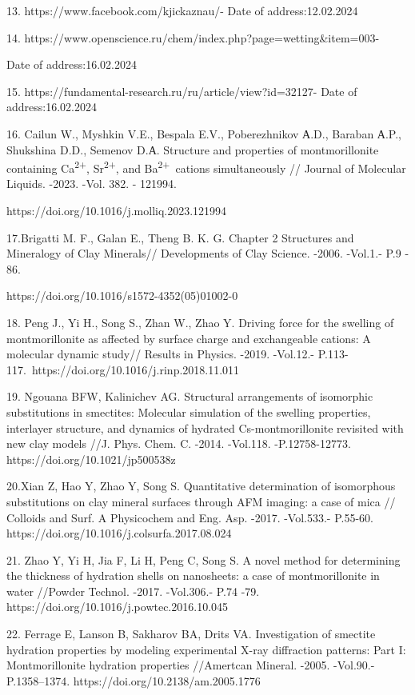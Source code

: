13. https://www.facebook.com/kjickaznau/- Date of address:12.02.2024

14. https://www.openscience.ru/chem/index.php?page=wetting\&item=003-

Date of address:16.02.2024

15. https://fundamental-research.ru/ru/article/view?id=32127- Date of
address:16.02.2024

16. Cailun W., Myshkin V.E., Bespala E.V., Poberezhnikov А.D., Baraban
А.P., Shukshina D.D., Semenov D.А. Structure and properties of
montmorillonite containing Ca\textsuperscript{2+},
Sr\textsuperscript{2+}, and Ba\textsuperscript{2+}~cations
simultaneously // Journal of Molecular Liquids. -2023. -Vol. 382. -
121994.

https://doi.org/10.1016/j.molliq.2023.121994

17.Brigatti M. F., Galan E., Theng B. K. G. Chapter 2 Structures and
Mineralogy of Clay Minerals// Developments of Clay Science. -2006.
-Vol.1.- P.9 - 86.~

https://doi.org/10.1016/s1572-4352(05)01002-0

18. Peng J., Yi H., Song S., Zhan W., Zhao Y. Driving force for the
swelling of montmorillonite as affected by surface charge and
exchangeable cations: A molecular dynamic study// Results in Physics.
-2019. -Vol.12.- P.113-117.~https://doi.org/10.1016/j.rinp.2018.11.011

19. Ngouana BFW, Kalinichev AG. Structural arrangements of isomorphic
substitutions in smectites: Molecular simulation of the swelling
properties, interlayer structure, and dynamics of hydrated
Cs-montmorillonite revisited with new clay models //J. Phys. Chem. C.
-2014. -Vol.118. -P.12758-12773. https://doi.org/10.1021/jp500538z

20.Xian Z, Hao Y, Zhao Y, Song S. Quantitative determination of
isomorphous substitutions on clay mineral surfaces through AFM imaging:
a case of mica // Colloids and Surf. A Physicochem and Eng. Asp. -2017.
-Vol.533.- P.55-60. https://doi.org/10.1016/j.colsurfa.2017.08.024

21. Zhao Y, Yi H, Jia F, Li H, Peng C, Song S. A novel method for
determining the thickness of hydration shells on nanosheets: a case of
montmorillonite in water //Powder Technol. -2017. -Vol.306.- P.74 -79.
https://doi.org/10.1016/j.powtec.2016.10.045

22. Ferrage E, Lanson B, Sakharov BA, Drits VA. Investigation of
smectite hydration properties by modeling experimental X-ray diffraction
patterns: Part I: Montmorillonite hydration properties //Amertcan
Mineral. -2005. -Vol.90.- P.1358--1374.
https://doi.org/10.2138/am.2005.1776


